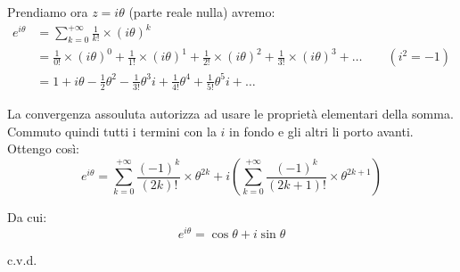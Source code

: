 \documentclass[../../dimostrazioni]{subfiles}
\begin{document}
                Prendiamo ora \( z = i\theta \) (parte reale nulla) avremo:
                \begin{align*}
                    e^{i\theta}  &=  \sum_{k=0}^{+\infty} \frac{1}{k!} \times (i\theta)^k \\
                    &= \frac{1}{0!} \times (i\theta)^0 + \frac{1}{1!} \times (i\theta)^1 + \frac{1}{2!} \times (i\theta)^2 +  \frac{1}{3!} \times (i\theta)^3 + \dots  \qquad (i^2 = -1)\\
                    &= 1 + i\theta - \frac{1}{2}\theta^2 - \frac{1}{3!}\theta^3i + \frac{1}{4!}\theta^4 + \frac{1}{5!}\theta^5i + \dots
                \end{align*}
                
                La convergenza assouluta autorizza ad usare le proprietà elementari della somma. 
                Commuto quindi tutti i termini con la \(i\) in fondo e gli altri li porto avanti. Ottengo così:
                \[  e^{i\theta} =\sum_{k=0}^{+\infty} \frac{(-1)^k}{(2k)!} \times \theta^{2k} + i\left(\sum_{k=0}^{+\infty} \frac{(-1)^k}{(2k+1)!} \times \theta^{2k+1}  \right)\]

                Da cui:
                \[ e^{i\theta} = \cos \theta + i \sin \theta \]

                c.v.d.
\end{document}
